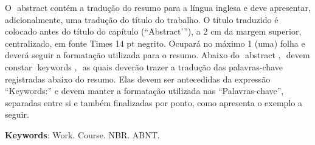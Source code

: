 %
%

\begin{ABSTRACT}
	\begin{SingleSpace}
	
		\hspace{-1.3 cm}O ​ abstract contém a tradução do resumo para a língua inglesa e deve apresentar,
adicionalmente, uma tradução do título do trabalho. O título traduzido é colocado antes
do título do capítulo (“Abstract’”), a 2 cm da margem superior, centralizado, em fonte
Times 14 pt negrito. Ocupará no máximo 1 (uma) folha e deverá seguir a formatação
utilizada para o resumo. Abaixo do ​ abstract , ​ devem constar ​ keywords , ​ as quais deverão
trazer a tradução das palavras-chave registradas abaixo do resumo. Elas devem ser
antecedidas da expressão “Keywords:” e devem manter a formatação utilizada nas
“Palavras-chave”, separadas entre si e também finalizadas por ponto, como apresenta o
exemplo a seguir.

		\vspace*{0.5cm}\hspace{-1.3 cm}\textbf{Keywords}: Work. Course. NBR. ABNT.
		
		
	\end{SingleSpace}

\end{ABSTRACT}
